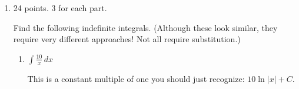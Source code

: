 \documentclass{article}
\begin{document}
\begin{enumerate}
\begin{enumerate}
    \item
      \begin{problem}[\vfill\newpage]
        $\displaystyle \int \frac{2t^2}{\sqrt{2t+6}}\,dt$
      \end{problem}

      \begin{solution} 
        It looks like a reasonable substitution is ;
        then, .  Also, we can express $t$ in terms of
        $u$ as :
        \begin{align*}
          \int \frac{\subd{2}\sube{t}^2}{\sqrt{\sub{2t+6}}}\,\subd{dt} &=
          \int \frac{\left( \sube{\frac{u - 6}{2}} \right)^2}
          {\sqrt{\sub{u}}}\,\subd{du} \\
          &= \frac{1}{4} \int \frac{(u - 6)^2}{\sqrt{u}}\,du \\
          &= \frac{1}{4} \int \frac{u^2 - 12u + 36}{\sqrt{u}}\,du \\
          &= \frac{1}{4} \int \left( u^{3/2} - 12 u^{1/2} + 36 u^{-1/2}
          \right) du \\
          &= \frac{1}{4} \left[ \frac{2}{5} u^{5/2} - 12 \cdot \frac{2}{3}
            u^{3/2} + 72 u^{1/2} \right] + C \\
          &= \boxed{\frac{1}{4} \left[ \frac{2}{5} (2t + 6)^{5/2} -
              8 (2t + 6)^{3/2} + 72 (2t + 6)^{1/2} \right] + C} \\
        \end{align*}
      \end{solution}
    \end{enumerate}    
    
\pspace{-12pt}

\item 

\begin{grading}
24 points. 3 for each part.  
\end{grading}

  Find the following indefinite integrals.  (Although these look
  similar, they require very different approaches!  Not all require
  substitution.) 

    \begin{enumerate}
    \item
      \begin{problem}[\vfill]
        $\displaystyle \int \frac{10}{x} \,dx$
      \end{problem}

      \begin{solution}
        This is a constant multiple of one you should just recognize:
        $\boxed{10\ln |x| + C}$.
      \end{solution}


\end{enumerate}
\end{enumerate}
\end{document}
